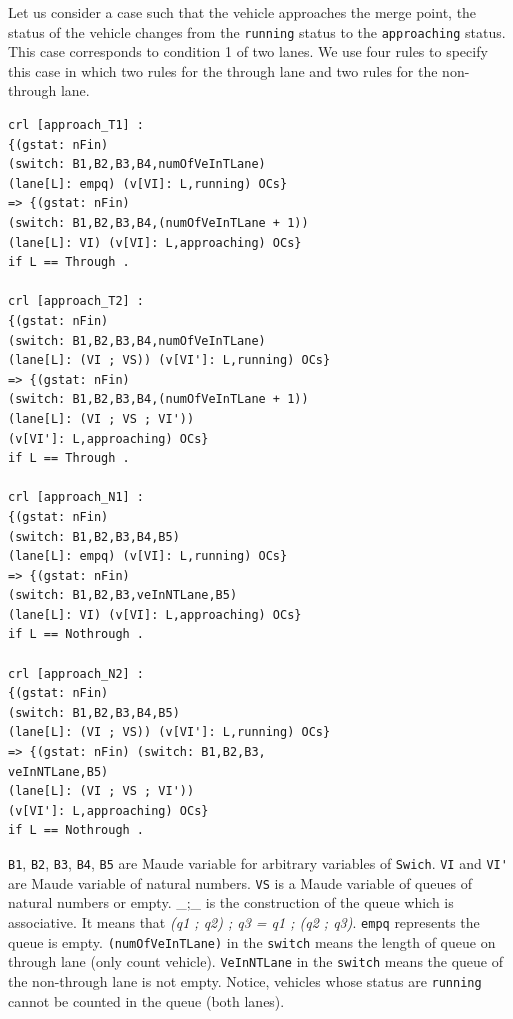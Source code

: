 \documentclass[10pt, conference, compsocconf]{IEEEtran}
\begin{document}
Let us consider a case such that the vehicle approaches the merge point, the status of the vehicle changes from the \verb!running! status to the \verb!approaching! status. 
This case corresponds to condition 1 of two lanes.
We use four rules to specify this case in which
two rules for the through lane and two rules for the non-through lane.


\begin{footnotesize}
\begin{verbatim}
crl [approach_T1] : 
{(gstat: nFin) 
(switch: B1,B2,B3,B4,numOfVeInTLane) 
(lane[L]: empq) (v[VI]: L,running) OCs} 
=> {(gstat: nFin) 
(switch: B1,B2,B3,B4,(numOfVeInTLane + 1)) 
(lane[L]: VI) (v[VI]: L,approaching) OCs} 
if L == Through .

crl [approach_T2] : 
{(gstat: nFin) 
(switch: B1,B2,B3,B4,numOfVeInTLane) 
(lane[L]: (VI ; VS)) (v[VI']: L,running) OCs} 
=> {(gstat: nFin) 
(switch: B1,B2,B3,B4,(numOfVeInTLane + 1)) 
(lane[L]: (VI ; VS ; VI')) 
(v[VI']: L,approaching) OCs} 
if L == Through .

crl [approach_N1] : 
{(gstat: nFin) 
(switch: B1,B2,B3,B4,B5) 
(lane[L]: empq) (v[VI]: L,running) OCs} 
=> {(gstat: nFin) 
(switch: B1,B2,B3,veInNTLane,B5) 
(lane[L]: VI) (v[VI]: L,approaching) OCs} 
if L == Nothrough .

crl [approach_N2] : 
{(gstat: nFin) 
(switch: B1,B2,B3,B4,B5) 
(lane[L]: (VI ; VS)) (v[VI']: L,running) OCs} 
=> {(gstat: nFin) (switch: B1,B2,B3,
veInNTLane,B5) 
(lane[L]: (VI ; VS ; VI')) 
(v[VI']: L,approaching) OCs} 
if L == Nothrough .
\end{verbatim}
\end{footnotesize}



\noindent \verb!B1!, \verb!B2!, \verb!B3!, \verb!B4!, \verb!B5! are Maude variable for arbitrary variables  of \verb!Swich!. 
\verb!VI! and \verb!VI'! are Maude variable of natural numbers. 
\verb!VS! is a Maude variable of queues of natural numbers or empty.
\_;\_ is the construction of the queue which is associative. 
It means that \textit{(q1 ; q2) ; q3 = q1 ; (q2 ; q3)}. 
\verb!empq! represents the queue is empty. 
\verb!(numOfVeInTLane)! in the \verb!switch! means the length of queue on through lane (only count vehicle).
\verb!VeInNTLane! in the \verb!switch! means the queue of the non-through lane is not empty. 
Notice, vehicles whose status are \verb!running! cannot be counted in the queue (both lanes).
\end{document}
